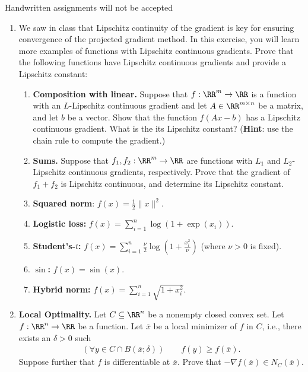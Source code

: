 \documentclass[11pt]{article}
\begin{document}
\newcommand{\Tcp}{T_{\mathrm{CP}}}
\newcommand{\Fix}{\mathrm{Fix}}
{\huge Handwritten assignments will not be accepted}
\begin{enumerate}
\item We saw in class that Lipschitz continuity of the gradient is key for ensuring convergence of the projected gradient method. In this exercise, you will learn more examples of functions with Lipschitz continuous gradients. Prove that the following functions have Lipschitz continuous gradients and provide a Lipschitz constant:
\begin{enumerate}
\item \textbf{Composition with linear.} Suppose that $f : \RR^m  \rightarrow \RR$ is a function with an $L$-Lipschitz continuous gradient and let $A \in\RR^{m \times n}$ be a matrix, and let $b$ be a vector. Show that the function $f(Ax - b)$ has a Lipschitz continuous gradient. What is the its Lipschitz constant? (\textbf{Hint}: use the chain rule to compute the gradient.)
\item \textbf{Sums.} Suppose that $f_1, f_2 : \RR^m  \rightarrow \RR$ are functions with $L_1$ and $L_2$-Lipschitz continuous gradients, respectively. Prove that the gradient of $f_1 + f_2$ is Lipschitz continuous, and determine its Lipschitz constant.
\item \textbf{Squared norm}: $f(x) = \frac{1}{2}\|x\|^2$.
\item \textbf{Logistic loss:} $f(x) = \sum_{i=1}^n\log(1 + \exp(x_i))$.
\item \textbf{Student's-$t$:} $f(x) = \sum_{i=1}^n\frac{\nu}{2} \log\left(1 + \frac{x_i^2}{\nu}\right)$ (where $\nu > 0$ is fixed).
\item \textbf{$\sin$:} $f(x) = \sin(x)$.
\item \textbf{Hybrid norm:} $f(x) = \sum_{i=1}^n\sqrt{1+x_i^2}$.
\end{enumerate}

\item \textbf{Local Optimality.} Let $C \subseteq \RR^n$ be a nonempty closed convex set. Let $f  :\RR^n \rightarrow \RR$ be a function. Let $\overline{x}$ be a local minimizer of $f$ in $C$, i.e., there exists an $\delta > 0$ such 
\begin{align*}
\left(\forall y \in C \cap B(\overline{x}; \delta)\right) \qquad f(y) \geq f(\overline{x}).
\end{align*}
Suppose further that $f$ is differentiable at $\overline{x}$. Prove that $-\nabla f(\overline{x}) \in N_{C}(\overline{x}).$


\end{enumerate}
\end{document}
